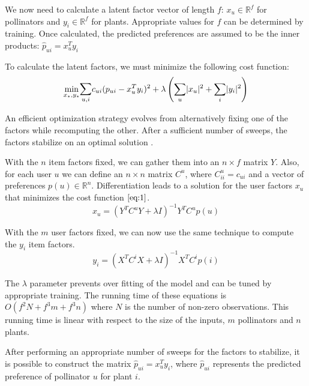 \documentclass[twocolumn]{article}
\begin{document}
We now need to calculate a latent factor vector of length $f$: $x_u \in \mathbb{R}^f$ for pollinators and 
$y_i \in \mathbb{R}^f$ for plants. Appropriate values for $f$ can be determined by training.
Once calculated, the predicted preferences are assumed to be the inner products: $\hat{p}_{ui} = x^{T}_{u}y_{i}$

To calculate the latent factors, we must minimize the following cost function:
\begin{equation}
  \label{eq:2}
  \underset{x_{*}, y_{*}}{\text{min}}
  \underset{u,i}{\mathlarger{\sum}}
  c_{ui}(p_{ui} - x^{T}_{u}y_{i})^2 + \lambda\left( 
  \underset{u}{\sum}|x_{u}|^2 + \underset{i}{\sum}|y_{i}|^2
  \right)
\end{equation}

An efficient optimization strategy evolves from alternatively fixing one of the factors while recomputing 
the other.  After a sufficient number of sweeps, the factors stabilize on an optimal solution \cite{hu2008collaborative}.

With the $n$ item factors fixed, we can gather them into an $n \times f$ matrix $Y$. Also, for each user $u$ we can
define an $n \times n$ matrix $C^u$, where $C^u_{ii} = c_{ui}$ and a vector of preferences $p(u) \in \mathbb{R}^n$.
Differentiation leads to a solution for the user factors $x_{u}$ that minimizes the cost function $\ref{eq:1}$\cite{hu2008collaborative}. 
\begin{equation}
  \label{eq:3}
  x_{u} = (Y^{T}C^{u}Y + \lambda I)^{-1}Y^{T}C^{u}p(u)
\end{equation}

With the $m$ user factors fixed, we can now use the same technique to compute the $y_i$ item factors.
\begin{equation}
  \label{eq:4}
  y_{i} = (X^{T}C^{i}X + \lambda I)^{-1}X^{T}C^{i}p(i)
\end{equation}

The $\lambda$ parameter prevents over fitting of the model and can be tuned by appropriate training.
The running time of these equations is $O(f^{2}N + f^{3}m + f^{3}n)$ where $N$ is the number of 
non-zero observations\cite{hu2008collaborative}. This running time is linear with respect to the size of the inputs, $m$ pollinators
and $n$ plants. 

After performing an appropriate number of sweeps for the factors to stabilize, it is possible to construct
the matrix $\hat{p}_{ui} = x^{T}_{u}y_{i}$, where $\hat{p}_{ui}$ represents the predicted preference of pollinator $u$
for plant $i$.
\end{document}
